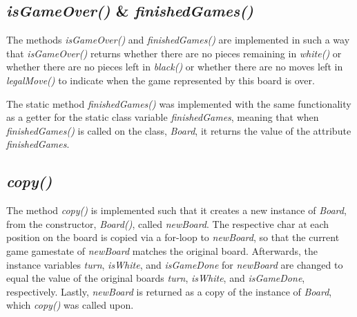 \documentclass[12pt, a4paper]{article}
\begin{document}
\subsection{\emph{isGameOver()} \& \emph{finishedGames()}}
The methods \emph{isGameOver()} and \emph{finishedGames()} are implemented in such a way that \emph{isGameOver()} returns whether there are no pieces remaining in \emph{white()} or whether there are no pieces left in \emph{black()} or whether there are no moves left in \emph{legalMove()} to indicate when the game represented by this board is over. \par
The static method \emph{finishedGames()} was implemented with the same functionality as a getter for the static class variable \emph{finishedGames}, meaning that when \emph{finishedGames()} is called on the class, \emph{Board}, it returns the value of the attribute \emph{finishedGames}.

\subsection{\emph{copy()}}
The method \emph{copy()} is implemented such that it creates a new instance of \emph{Board}, from the constructor, \emph{Board()}, called \emph{newBoard}. The respective char at each position on the board is copied via a for-loop to \emph{newBoard}, so that the current game gamestate of \emph{newBoard} matches the original board. Afterwards, the instance variables \emph{turn}, \emph{isWhite}, and \emph{isGameDone} for \emph{newBoard} are changed to equal the value of the original boards \emph{turn}, \emph{isWhite}, and \emph{isGameDone}, respectively. Lastly, \emph{newBoard} is returned as a copy of the instance of \emph{Board}, which \emph{copy()} was called upon. \par
\end{document}
